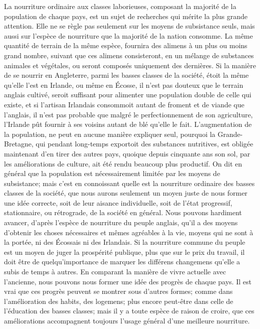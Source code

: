 La nourriture ordinaire aux classes laborieuses, composant la majorité de la population de chaque pays, est un sujet de recherches qui mérite la plus grande attention. Elle ne se règle pas seulement sur les moyens\setcounter{page}{350} de subsistance seuls, mais aussi sur l'espèce de nourriture que la majorité de la nation consomme. La même quantité de terrain de la même espèce, fournira des alimens à un plus ou moins grand nombre, suivant que ces alimens consisteront, en un mélange de substances animales et végétales, ou seront composés uniquement des dernières. Si la manière de se nourrir en Angleterre, parmi les basses classes de la société, étoit la même qu'elle l'est en Irlande, ou même en Écosse, il n'est pas douteux que le terrain anglais cultivé, seroit suffisant pour alimenter une population double de celle qui existe, et si l'artisan Irlandais consommoit autant de froment et de viande que l'anglais, il n'est pas probable que malgré le perfectionnement de son agriculture, l'Irlande pût fournir à ses voisins autant de blé qu'elle le fait. L'augmentation de la population, ne peut en aucune manière expliquer seul, pourquoi la Grande-Bretagne, qui pendant long-temps exportoit des substances nutritives, est obligée maintenant d'en tirer des autres pays, quoique depuis cinquante ans son sol, par les améliorations de culture, ait été rendu beaucoup plus productif.
On dit en général que la population est nécessairement limitée par les moyens de\setcounter{page}{351} subsistance; mais c'est en connoissant quelle est la nourriture ordinaire des basses classes de la société, que nous aurons seulement un moyen juste de nous former une idée correcte, soit de leur aisance individuelle, soit de l'état progressif, stationnaire, ou rétrograde, de la société en général. Nous pouvons hardiment avancer, d'après l'espèce de nourriture du peuple anglais, qu'il a des moyens d'obtenir les choses nécessaires et mêmes agréables à la vie, moyens qui ne sont à la portée, ni des Écossais ni des Irlandais.
Si la nourriture commune du peuple est un moyen de juger la prospérité publique, plus que sur le prix du travail, il doit être de quelqu'importance de marquer les différens changemens qu'elle a subis de temps à autres. En comparant la manière de vivre actuelle avec l'ancienne, nous pouvons nous former une idée des progrès de chaque pays. Il est vrai que ces progrès peuvent se montrer sous d'autres formes; comme dans l'amélioration des habits, des logemens; plus encore peut-être dans celle de l'éducation des basses classes; mais il y a toute espèce de raison de croire, que ces améliorations accompagnent toujours l'usage général d'une meilleure nourriture.
